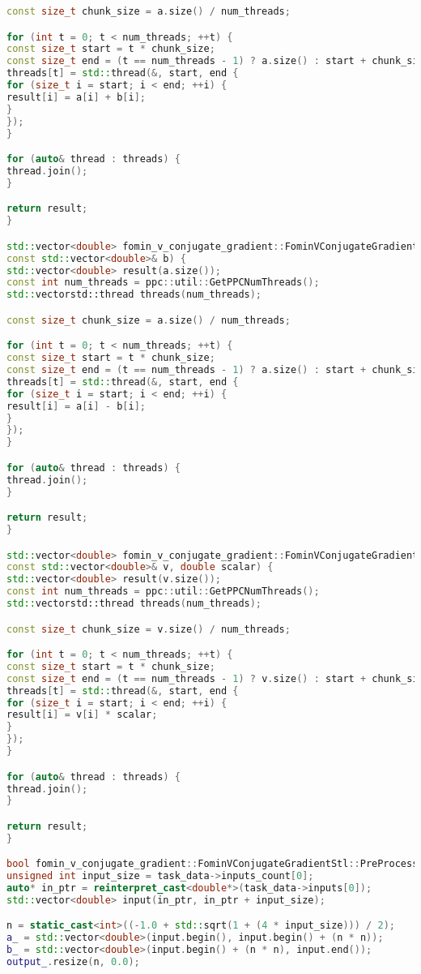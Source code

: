 \documentclass[12pt]{article}
\begin{document}
\begin{lstlisting}[language=C++]
const size_t chunk_size = a.size() / num_threads;

for (int t = 0; t < num_threads; ++t) {
const size_t start = t * chunk_size;
const size_t end = (t == num_threads - 1) ? a.size() : start + chunk_size;
threads[t] = std::thread(&, start, end {
for (size_t i = start; i < end; ++i) {
result[i] = a[i] + b[i];
}
});
}

for (auto& thread : threads) {
thread.join();
}

return result;
}

std::vector<double> fomin_v_conjugate_gradient::FominVConjugateGradientStl::VectorSub(const std::vector<double>& a,
const std::vector<double>& b) {
std::vector<double> result(a.size());
const int num_threads = ppc::util::GetPPCNumThreads();
std::vectorstd::thread threads(num_threads);

const size_t chunk_size = a.size() / num_threads;

for (int t = 0; t < num_threads; ++t) {
const size_t start = t * chunk_size;
const size_t end = (t == num_threads - 1) ? a.size() : start + chunk_size;
threads[t] = std::thread(&, start, end {
for (size_t i = start; i < end; ++i) {
result[i] = a[i] - b[i];
}
});
}

for (auto& thread : threads) {
thread.join();
}

return result;
}

std::vector<double> fomin_v_conjugate_gradient::FominVConjugateGradientStl::VectorScalarMultiply(
const std::vector<double>& v, double scalar) {
std::vector<double> result(v.size());
const int num_threads = ppc::util::GetPPCNumThreads();
std::vectorstd::thread threads(num_threads);

const size_t chunk_size = v.size() / num_threads;

for (int t = 0; t < num_threads; ++t) {
const size_t start = t * chunk_size;
const size_t end = (t == num_threads - 1) ? v.size() : start + chunk_size;
threads[t] = std::thread(&, start, end {
for (size_t i = start; i < end; ++i) {
result[i] = v[i] * scalar;
}
});
}

for (auto& thread : threads) {
thread.join();
}

return result;
}

bool fomin_v_conjugate_gradient::FominVConjugateGradientStl::PreProcessingImpl() {
unsigned int input_size = task_data->inputs_count[0];
auto* in_ptr = reinterpret_cast<double*>(task_data->inputs[0]);
std::vector<double> input(in_ptr, in_ptr + input_size);

n = static_cast<int>((-1.0 + std::sqrt(1 + (4 * input_size))) / 2);
a_ = std::vector<double>(input.begin(), input.begin() + (n * n));
b_ = std::vector<double>(input.begin() + (n * n), input.end());
output_.resize(n, 0.0);


\end{lstlisting}
\end{document}
